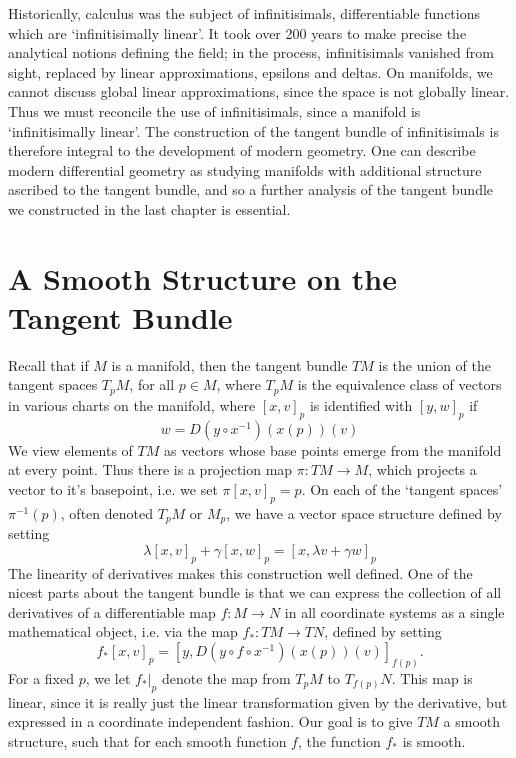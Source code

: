 Historically, calculus was the subject of infinitisimals, differentiable functions which are `infinitisimally linear'. It took over 200 years to make precise the analytical notions defining the field; in the process, infinitisimals vanished from sight, replaced by linear approximations, epsilons and deltas. On manifolds, we cannot discuss global linear approximations, since the space is not globally linear. Thus we must reconcile the use of infinitisimals, since a manifold is `infinitisimally linear'. The construction of the tangent bundle of infinitisimals is therefore integral to the development of modern geometry. One can describe modern differential geometry as studying manifolds with additional structure ascribed to the tangent bundle, and so a further analysis of the tangent bundle we constructed in the last chapter is essential.

\section{A Smooth Structure on the Tangent Bundle}

Recall that if $M$ is a manifold, then the tangent bundle $TM$ is the union of the tangent spaces $T_p M$, for all $p \in M$, where $T_p M$ is the equivalence class of vectors in various charts on the manifold, where $[x,v]_p$ is identified with $[y,w]_p$ if
%
\[ w = D(y \circ x^{-1})(x(p))(v) \]
%
We view elements of $TM$ as vectors whose base points emerge from the manifold at every point. Thus there is a projection map $\pi: TM \to M$, which projects a vector to it's basepoint, i.e. we set $\pi [x,v]_p = p$. On each of the `tangent spaces' $\pi^{-1}(p)$, often denoted $T_pM$ or $M_p$, we have a vector space structure defined by setting
%
\[ \lambda [x,v]_p + \gamma [x,w]_p = [x,\lambda v + \gamma w]_p \]
%
The linearity of derivatives makes this construction well defined. One of the nicest parts about the tangent bundle is that we can express the collection of all derivatives of a differentiable map $f: M \to N$ in all coordinate systems as a single mathematical object, i.e. via the map $f_*: TM \to TN$, defined by setting
%
\[ f_*[x,v]_p = \left[ y, D(y \circ f \circ x^{-1})(x(p))(v) \right]_{f(p)}. \]
%
For a fixed $p$,  we let $f_*|_p$ denote the map from $T_p M$ to $T_{f(p)} N$. This map is linear, since it is really just the linear transformation given by the derivative, but expressed in a coordinate independent fashion. Our goal is to give $TM$ a smooth structure, such that for each smooth function $f$, the function $f_*$ is smooth.

